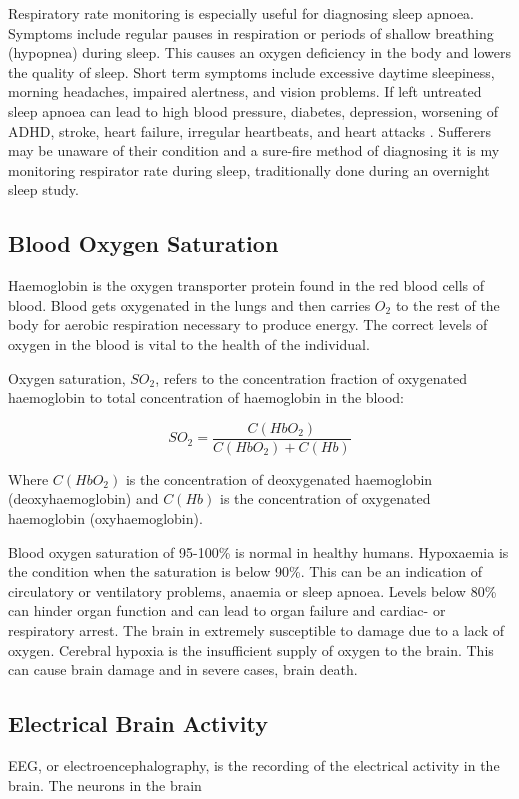\medskip

Respiratory rate monitoring is especially useful for diagnosing sleep apnoea. Symptoms include regular pauses in respiration or periods of shallow breathing (hypopnea) during sleep. This causes an oxygen deficiency in the body and lowers the quality of sleep. Short term symptoms include excessive daytime sleepiness, morning headaches, impaired alertness, and vision problems. If left untreated sleep apnoea can lead to high blood pressure, diabetes, depression, worsening of ADHD, stroke, heart failure, irregular heartbeats, and heart attacks \citep{webMDSleepApnoea}. Sufferers may be unaware of their condition and a sure-fire method of diagnosing it is my monitoring respirator rate during sleep, traditionally done during an overnight sleep study.

\subsection{Blood Oxygen Saturation}

Haemoglobin is the oxygen transporter protein found in the red blood cells of blood. Blood gets oxygenated in the lungs and then carries $O_2$ to the rest of the body for aerobic respiration necessary to produce energy. The correct levels of oxygen in the blood is vital to the health of the individual.

\medskip

Oxygen saturation, $SO_2$, refers to the concentration fraction of oxygenated haemoglobin to total concentration of haemoglobin in the blood:

$$SO_2  =  \frac{C(HbO_2)}{C(HbO_2)+C(Hb)}$$

Where $C(HbO_2)$ is the concentration of deoxygenated haemoglobin (deoxyhaemoglobin) and $C(Hb)$ is the concentration of oxygenated haemoglobin (oxyhaemoglobin).

\medskip

Blood oxygen saturation of 95-100\% is normal in healthy humans. Hypoxaemia is the condition when the saturation is below 90\%. This can be an indication of circulatory or ventilatory problems, anaemia or sleep apnoea. Levels below 80\% can hinder organ function and can lead to organ failure and cardiac- or respiratory arrest. The brain in extremely susceptible to damage due to a lack of oxygen. Cerebral hypoxia is the insufficient supply of oxygen to the brain. This can cause brain damage and in severe cases, brain death.

\subsection{Electrical Brain Activity}
EEG, or electroencephalography, is the recording of the electrical activity in the brain. The neurons in the brain





